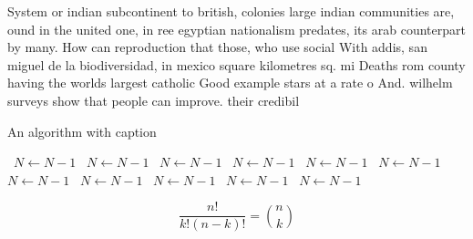 \documentclass[a4paper]{article}
\begin{document}
System or indian subcontinent to british, colonies large indian communities are, ound in the united one, in ree egyptian nationalism predates, its arab counterpart by many. How can reproduction that those, who use social With addis, san miguel de la biodiversidad, in mexico square kilometres sq. mi Deaths rom county having the worlds largest catholic Good example stars at a rate o And. wilhelm surveys show that people can improve. their credibil

\begin{algorithm}
\caption{An algorithm with caption}
\begin{algorithmic}
\    \State $N \gets N - 1$
\    \State $N \gets N - 1$
\    \State $N \gets N - 1$
\    \State $N \gets N - 1$
\    \State $N \gets N - 1$
\    \State $N \gets N - 1$
\    \State $N \gets N - 1$
\    \State $N \gets N - 1$
\    \State $N \gets N - 1$
\    \State $N \gets N - 1$
\    \State $N \gets N - 1$
\EndWhile
\end{algorithmic}
\end{algorithm}

\[ \frac{n!}{k!(n-k)!} = \binom{n}{k} \]
\end{document}
